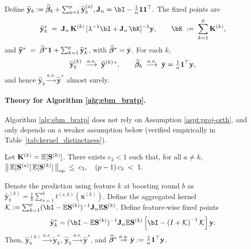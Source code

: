     \begin{theorem}
		\label{thm:finite-sample-convergence-1}
		Define $\widehat{\mathbf{y}}_{b}:=\widehat{\bbeta}_{b}+\sum_{a=1}^{p}\widehat{\mathbf{y}}^{(a)}_{b},
		\jmat=\bI-\tfrac{1}{n}\bone\bone^\top.$
		The fixed points are
		\[
		\widetilde{\mathbf{y}}_k^* \;=\; \jmat\,\Kmatk\,[\lambda^{-1}\bI+\jmat\,\bK]^{-1}\mathbf{y},
		\qquad
        \bK\;:=\;\sum_{k=1}^{p}\Kmatk,
        \]
		and $\widehat{\mathbf{y}}^*\;=\;\widehat{\bm{\beta}}^*\mathbf{1}+\sum_{k=1}^{p}\widetilde{\mathbf{y}}_k^*$,
		with $\widehat{\bm{\beta}}^*=\bar{\mathbf{y}}$. For each $k$,
        $$
        \widehat{\mathbf{y}}^{(k)}_{b}\;\stackrel{a.s.}{\longrightarrow}\; \widetilde{\mathbf{y}}^{(k)\,*},
		\qquad
		\widehat{\bm{\beta}}_{b}\;\stackrel{a.s.}{\longrightarrow}\;\bar{\mathbf{y}}=\tfrac{1}{n}\mathbf{1}^\top\mathbf{y},
		$$
		and hence $\widehat{\mathbf{y}}_{b}\stackrel{a.s.}{\to} \widehat{\mathbf{y}}^*$ almost surely.
	\end{theorem}

    \paragraph{Theory for Algorithm \ref{alg:ebm_bratp}.}
    Algorithm \ref{alg:ebm_bratp} does not rely on Assumption \ref{aspt:proj-orth}, and only depends on a weaker assumption below (verified empirically in Table~\ref{tab:kernel_distinctness}).
    \begin{assumption}
		\label{aspt:kernel-spec}
		Let $\mathbf{K}^{(k)}=\mathbb{E}[\mathbf{S}^{(k)}]$. There exists $c_3<1$ such that, for all $a\ne k$,
			$
			\big\|\, \mathbb{E}[\mathbf{S}^{(a)}]\,\mathbb{E}[\mathbf{S}^{(k)}] \,\big\|_{\mathrm{op}} \;\le\; c_3,
			\quad
			(p-1)\,c_3 \;<\; 1.
			$
	\end{assumption}

    \begin{theorem}
		\label{thm:finite-sample-convergence-2}
		Denote the prediction using feature $k$ at boosting round $b$ as $\widehat{\mathbf{y}}^{(k)}_b = \frac{1}{b}\sum_{s=1}^bt^{(s, k)}(\mathbf{x}^{(k)})$.
		Define the aggregated kernel $\mathcal{K}:=\sum_{k=1}^{p}(\bI-\E\Smatk)^{-1}\jmat\E\Smatk$. Define feature-wise fixed points
		\[
		\widetilde{\mathbf{y}}_k^* = (\bI-\E\Smatk)^{-1} \jmat\E\Smatk\left[\bI - \left(I+\mathcal{K}\right)^{-1}\mathcal{K}\right]\mathbf{y}.
		\]
		Then, $\widehat{\mathbf{y}}^{(k)}_b \overset{a.s.}{\to}\widetilde{\mathbf{y}}_k^*$, $\widehat{\mathbf{y}}_b\overset{a.s.}{\to}\widehat{\mathbf{y}}^*$, and $\widehat{\bm{\beta}}^* \overset{a.s.}{\to}\bar{\mathbf{y}}:=\frac{1}{n}\mathbf{1}^\top\mathbf{y}.$
	\end{theorem}

